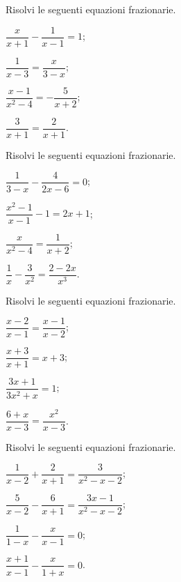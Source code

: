 \begin{esercizio}[\Ast]
\label{ese:20.16}
Risolvi le seguenti equazioni frazionarie.
\begin{multicols}{2}
\begin{enumeratea}
 \item $\dfrac{x}{x+1}-\dfrac{1}{x-1}=1$;
 \item $\dfrac{1}{x-3}=\dfrac{x}{3-x}$;
 \item $\dfrac{x-1}{x^{2}-4}=-{\dfrac{5}{x+2}}$;
 \item $\dfrac{3}{x+1}=\dfrac{2}{x+1}$.
\end{enumeratea}
\end{multicols}
\end{esercizio}
\begin{esercizio}[\Ast]
\label{ese:20.17}
Risolvi le seguenti equazioni frazionarie.
\begin{multicols}{2}
\begin{enumeratea}
 \item $\dfrac{1}{3-x}-\dfrac{4}{2x-6}=0$;
 \item $\dfrac{x^{2}-1}{x-1}-1=2x+1$;
 \item $\dfrac{x}{x^{2}-4}=\dfrac{1}{x+2}$;
 \item $\dfrac{1}{x}-\dfrac{3}{x^{2}}=\dfrac{2-2x}{x^{3}}$.
\end{enumeratea}
\end{multicols}
\end{esercizio}

\begin{esercizio}[\Ast]
\label{ese:20.18}
Risolvi le seguenti equazioni frazionarie.
\begin{multicols}{2}
\begin{enumeratea}
 \item $\dfrac{x-2}{x-1}=\dfrac{x-1}{x-2}$;
 \item $\dfrac{x+3}{x+1}=x+3$;
 \item $\dfrac{3x+1}{3x^{2}+x}=1$;
 \item $\dfrac{6+x}{x-3}=\dfrac{x^{2}}{x-3}$.
\end{enumeratea}
\end{multicols}
\end{esercizio}

\begin{esercizio}[\Ast]
\label{ese:20.19}
Risolvi le seguenti equazioni frazionarie.
\begin{multicols}{2}
\begin{enumeratea}
 \item $\dfrac{1}{x-2}+\dfrac{2}{x+1}=\dfrac{3}{x^{2}-x-2}$;
 \item $\dfrac{5}{x-2}-\dfrac{6}{x+1}=\dfrac{3x-1}{x^{2}-x-2}$;
 \item $\dfrac{1}{1-x}-\dfrac{x}{x-1}=0$;
 \item $\dfrac{x+1}{x-1}-\dfrac{x}{1+x}=0$.
\end{enumeratea}
\end{multicols}
\end{esercizio}

